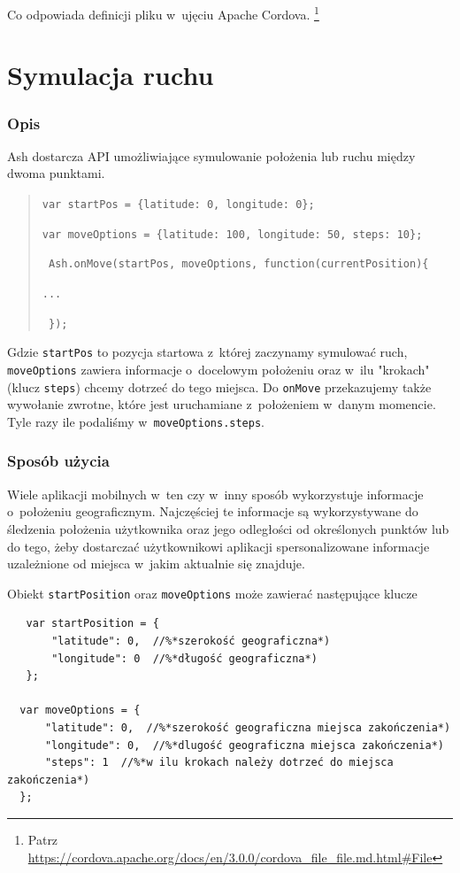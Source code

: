 \documentclass[brudnopis]{xmgr}
\begin{document}
Co odpowiada definicji pliku w~ujęciu Apache Cordova. 
\footnote{Patrz \url{https://cordova.apache.org/docs/en/3.0.0/cordova_file_file.md.html\#File} }

\section{Symulacja ruchu}

\subsubsection{Opis}
Ash dostarcza API umożliwiające symulowanie położenia lub ruchu między dwoma punktami.

\begin{quote}
  \texttt{var startPos = \{latitude: 0, longitude: 0\};}

  \texttt{var moveOptions = \{latitude: 100, longitude: 50, steps: 10\};}

  \texttt{ Ash.onMove(startPos, moveOptions, function(currentPosition)\{  }

    \texttt{...} 

  \texttt{   \});  }
\end{quote}

Gdzie \texttt{startPos} to pozycja startowa z~której zaczynamy symulować ruch, \texttt{moveOptions} zawiera informacje o~docelowym położeniu oraz w~ilu "krokach" (klucz \texttt{steps}) chcemy dotrzeć do tego miejsca. Do \texttt{onMove} przekazujemy także wywołanie zwrotne, które jest uruchamiane z~położeniem w~danym momencie. Tyle razy ile podaliśmy w~\texttt{moveOptions.steps}. 

\subsubsection{Sposób użycia}

Wiele aplikacji mobilnych w~ten czy w~inny sposób wykorzystuje informacje o~położeniu geograficznym. Najczęściej te informacje są wykorzystywane do śledzenia położenia użytkownika oraz jego odległości od określonych punktów lub do tego, żeby dostarczać użytkownikowi aplikacji spersonalizowane informacje uzależnione od miejsca w~jakim aktualnie się znajduje. 

Obiekt \texttt{startPosition} oraz \texttt{moveOptions} może zawierać następujące klucze

\begin{lstlisting}
   var startPosition = {
       "latitude": 0,  //%*szerokość geograficzna*)
       "longitude": 0  //%*długość geograficzna*)
   };
 
  var moveOptions = {
      "latitude": 0,  //%*szerokość geograficzna miejsca zakończenia*)
      "longitude": 0,  //%*dlugość geograficzna miejsca zakończenia*)
      "steps": 1  //%*w ilu krokach należy dotrzeć do miejsca zakończenia*)
  };
\end{lstlisting}
\end{document}
